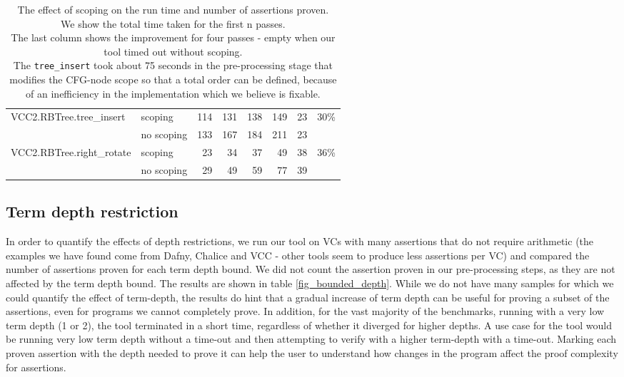 \begin{table}
\begin{tabular}{|l|l||r|r|r|r||r|r|}
\hline
VCC2.RBTree.tree\_insert   &  scoping    & 114 &	131 & 138 & 149 & 23 & 30\%\\
                          &  no scoping & 133 & 167 & 184 & 211 & 23  & \\
\hline
VCC2.RBTree.right\_rotate   &  scoping    & 23&	34 & 37 & 49 & 38 & 36\%\\
                          &  no scoping & 29 & 49 & 59 & 77 & 39 & \\
\hline
\end{tabular}
\caption{The effect of scoping on the run time and number of assertions proven.\\
We show the total time taken for the first n passes.\\
The last column shows the improvement for four passes - empty when our tool timed out without scoping.\\
The \lstinline|tree_insert| took about 75 seconds in the pre-processing stage that modifies the CFG-node scope so that a total order can be defined, because of an inefficiency in the implementation which we believe is fixable.}
\label{fig_results_scoping}
\end{table}

\subsection*{Term depth restriction}
In order to quantify the effects of depth restrictions, we run our tool on VCs with many assertions that do not require arithmetic (the examples we have found come from Dafny, Chalice and VCC - other tools seem to produce less assertions per VC) and compared the number of assertions proven for each term depth bound. We did not count the assertion proven in our pre-processing steps, as they are not affected by the term depth bound. 
The results are shown in table \ref{fig_bounded_depth}. 
While we do not have many samples for which we could quantify the effect of term-depth, the results do hint that a gradual increase of term depth can be useful for proving a subset of the assertions, even for programs we cannot completely prove. 
In addition, for the vast majority of the benchmarks, running with a very low term depth (1 or 2), the tool terminated in a short time, regardless of whether it diverged for higher depths.
A use case for the tool would be running very low term depth without a time-out and then attempting to verify with a higher term-depth with a time-out. Marking each proven assertion with the depth needed to prove it can help the user to understand how changes in the program affect the proof complexity for assertions.

